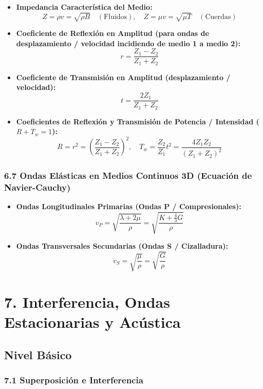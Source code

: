 \documentclass[11pt,a4paper]{article}
\begin{document}
\begin{itemize}
  \item \textbf{Impedancia Característica del Medio:}
  \[
    Z = \rho v = \sqrt{\rho B} \quad (\text{Fluidos}), \quad Z = \mu v = \sqrt{\mu T} \quad (\text{Cuerdas})
  \]
  \item \textbf{Coeficiente de Reflexión en Amplitud (para ondas de desplazamiento / velocidad incidiendo de medio 1 a medio 2):}
  \[
    r = \frac{Z_1 - Z_2}{Z_1 + Z_2}
  \]
  \item \textbf{Coeficiente de Transmisión en Amplitud (desplazamiento / velocidad):}
  \[
    t = \frac{2Z_1}{Z_1 + Z_2}
  \]
  \item \textbf{Coeficientes de Reflexión y Transmisión de Potencia / Intensidad ($R + T_w = 1$):}
  \[
    R = r^2 = \left( \frac{Z_1 - Z_2}{Z_1 + Z_2} \right)^2, \quad T_w = \frac{Z_2}{Z_1} t^2 = \frac{4 Z_1 Z_2}{(Z_1 + Z_2)^2}
  \]
\end{itemize}

\subsubsection*{6.7 Ondas Elásticas en Medios Continuos 3D (Ecuación de Navier-Cauchy)}

\begin{itemize}
  \item \textbf{Ondas Longitudinales Primarias (Ondas P / Compresionales):}
  \[
    v_P = \sqrt{\frac{\lambda + 2\mu}{\rho}} = \sqrt{\frac{K + \frac{4}{3}G}{\rho}}
  \]
  \item \textbf{Ondas Transversales Secundarias (Ondas S / Cizalladura):}
  \[
    v_S = \sqrt{\frac{\mu}{\rho}} = \sqrt{\frac{G}{\rho}}
  \]
\end{itemize}

\section*{7. Interferencia, Ondas Estacionarias y Acústica}

\subsection*{Nivel Básico}

\subsubsection*{7.1 Superposición e Interferencia}
\end{document}
